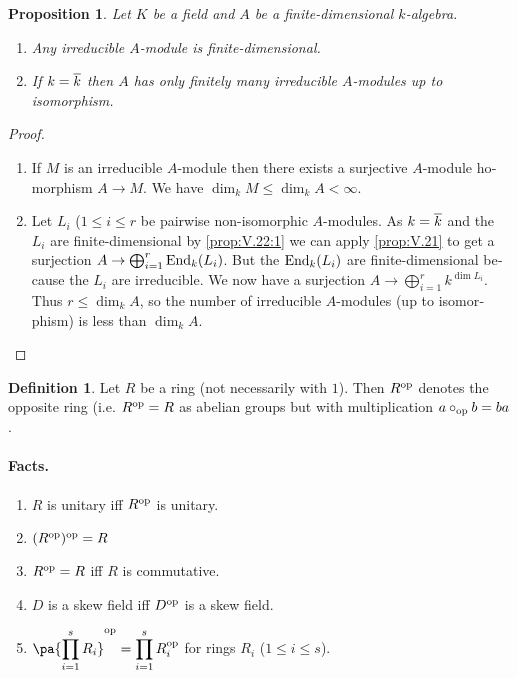 \documentclass[12pt,a4paper]{scrartcl}
\theoremstyle{cplain}
\theoremstyle{cplain}
\theoremstyle{cplain}
\newtheorem{prop}[thmcounter]{Proposition}
\theoremstyle{definition}
\newtheorem*{deff}{Definition}
\begin{document}
\begin{otherlanguage}{english}

\begin{prop} \label{prop:V.22} %
  Let $K$ be a field and $A$ be a finite-dimensional $k$-algebra.
  \begin{enumerate}
    \item \label{prop:V.22:1} Any irreducible $A$-module is finite-dimensional.
    \item \label{prop:V.22:2} If $k=\overline k$ then $A$ has only finitely many irreducible $A$-modules up to isomorphism.
  \end{enumerate}
\end{prop}
\begin{proof}
  \leavevmode
  \begin{enumerate}[label=\ref{prop:V.22:\arabic*}]
   \item If $M$ is an irreducible $A$-module then there exists a surjective $A$-module homorphism $A \to M$. We have $\dim_kM\le\dim_k A <\infty$.
   \item Let $L_i$ ($1\le i\le r$ be pairwise non-isomorphic $A$-modules. As $k=\overline k$ and the $L_i$ are finite-dimensional by \ref{prop:V.22:1} we can apply \cref{prop:V.21} to get a surjection $A \to \bigoplus_{i=1}^r \operatorname{End}_k(L_i)$. But the $\operatorname{End}_k(L_i)$ are finite-dimensional because the $L_i$ are irreducible. We now have a surjection $A \to \bigoplus_{i=1}^r k^{\dim L_i}$. Thus $r \le \dim_k A$, so the number of irreducible $A$-modules (up to isomorphism) is less than $\dim_k A$.
   \qedhere
  \end{enumerate}
\end{proof}

\begin{deff}
  Let $R$ be a ring (not necessarily with $1$). Then $R^{\operatorname{op}}$ denotes the opposite ring (i.e. $R^{\operatorname{op}} = R$ as abelian groups but with multiplication $a \circ_{\operatorname{op}} b = ba$.
\end{deff}

\paragraph{Facts.}
\begin{enumerate}
  \item $R$ is unitary iff $R^{\operatorname{op}}$ is unitary.
  \item $(R^{\operatorname{op}})^{\operatorname{op}} = R$
  \item $R^{\operatorname{op}} = R$ iff $R$ is commutative.
  \item $D$ is a skew field iff $D^{\operatorname{op}}$ is a skew field.
  \item ${\displaystyle \pa{\prod_{i=1}^s R_i}^{\op} = \prod_{i=1}^sR_i^{\op}}$ for rings $R_i$ ($1\le i\le s$).
\end{enumerate}


\end{otherlanguage}
\end{document}
